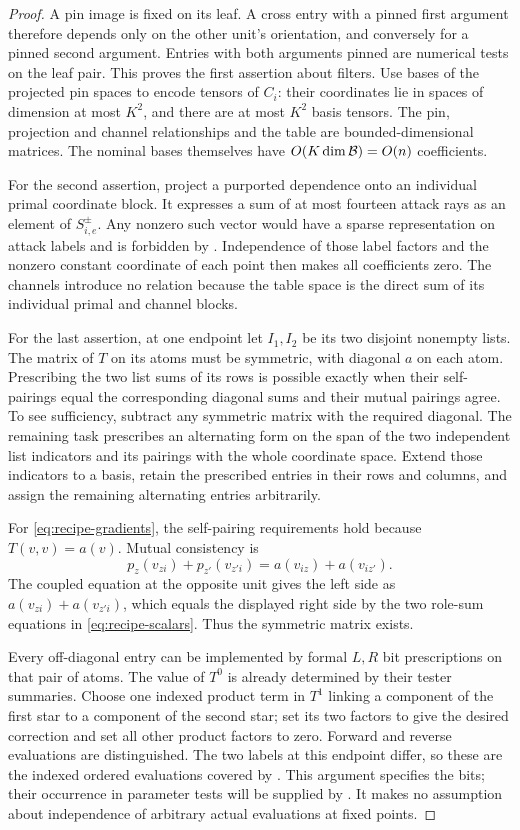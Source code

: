 \begin{proof}
A pin image is fixed on its leaf.  A cross entry with a pinned
first argument therefore depends only on the other unit's
orientation, and conversely for a pinned second argument.
Entries with both arguments pinned are numerical tests on the
leaf pair.  This proves the first assertion about filters.
Use bases of the projected pin spaces to encode tensors of
$C_i$: their coordinates lie in spaces of dimension at most
$K^2$, and there are at most $K^2$ basis tensors.  The pin,
projection and channel relationships and the table are
bounded-dimensional matrices.  The nominal bases themselves
have $O(K\dim\mathcal B)=O(n)$ coefficients.

For the second assertion, project a purported dependence onto
an individual primal coordinate block.  It expresses a sum of
at most fourteen attack rays as an element of $S_{i,e}^{\pm}$.
Any nonzero such vector would have a sparse representation on
attack labels and is forbidden by .
Independence of those label factors and the nonzero constant
coordinate of each point then makes all coefficients zero.
The channels introduce no relation because the table space
is the direct sum of its individual primal and channel blocks.

For the last assertion, at one endpoint let $I_1,I_2$ be its
two disjoint nonempty lists.  The matrix of $T$ on its atoms
must be symmetric, with diagonal $a$ on each atom.
Prescribing the two list sums of its rows is possible exactly
when their self-pairings equal the corresponding diagonal
sums and their mutual pairings agree.  To see sufficiency,
subtract any symmetric matrix with the required diagonal.
The remaining task prescribes an alternating form on the
span of the two independent list indicators and its pairings
with the whole coordinate space.  Extend those indicators to
a basis, retain the prescribed entries in their rows and
columns, and assign the remaining alternating entries
arbitrarily.

For \eqref{eq:recipe-gradients}, the self-pairing requirements
hold because $T(v,v)=a(v)$.  Mutual consistency is
\[
 p_z(v_{zi})+p_{z'}(v_{z'i})
       =a(v_{iz})+a(v_{iz'}).
\]
The coupled equation at the opposite unit gives the left side
as $a(v_{zi})+a(v_{z'i})$, which equals the displayed right side
by the two role-sum equations in \eqref{eq:recipe-scalars}.
Thus the symmetric matrix exists.

Every off-diagonal entry can be implemented by formal $L,R$
bit prescriptions on that pair of atoms.  The value of $T^0$
is already determined by their tester summaries.  Choose one
indexed product term in $T^1$ linking a component of the first
star to a component of the second star; set its two factors to
give the desired correction and set all other product factors
to zero.  Forward and reverse evaluations are distinguished.
The two labels at this endpoint differ, so these are the
indexed ordered evaluations covered by
.  This argument specifies the bits;
their occurrence in parameter tests will be supplied by
.  It makes no assumption about
independence of arbitrary actual evaluations at fixed points.
\end{proof}

